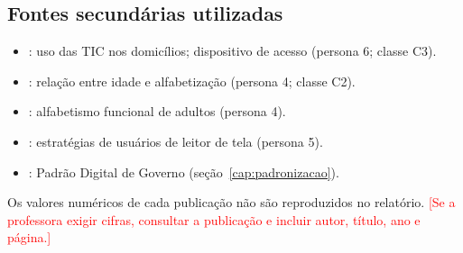 \documentclass[
  12pt,
  oneside,
  a4paper,
  chapter=TITLE,
  section=TITLE,
  english,
  brazilian
]{abntex2}
\newcommand{\preencher}[1]{\textcolor{red}{[#1]}}
\begin{document}
\begin{apendicesenv}
\chapter{Fontes secundárias utilizadas}\label{ap:fontes}

\begin{itemize}
  \item {}: uso das TIC nos domicílios; dispositivo de acesso (persona 6; classe C3).
  \item {}: relação entre idade e alfabetização (persona 4; classe C2).
  \item {}: alfabetismo funcional de adultos (persona 4).
  \item {}: estratégias de usuários de leitor de tela (persona 5).
  \item {}: Padrão Digital de Governo (seção~\ref{cap:padronizacao}).
\end{itemize}

Os valores numéricos de cada publicação não são reproduzidos no relatório.
\preencher{Se a professora exigir cifras, consultar a publicação e incluir autor, título, ano e página.}

\end{apendicesenv}
\end{document}
